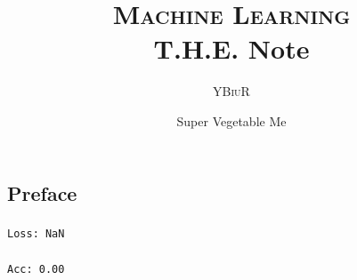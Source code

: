 \documentclass[oneside]{book}
\title{\textsc{Machine Learning}\\T.H.E. Note}
\author{\textsc{YBiuR}}
\date{Super Vegetable Me}
\theoremstyle{definition}
\theoremstyle{remark}
\begin{document}
\begin{spacing}{1.5}
\setlength{\parindent}{0em}

\frontmatter
\maketitle
\chapter*{Preface}
\paragraph{}\verb|Loss: NaN|
\paragraph{}\verb|Acc: 0.00|
\mainmatter



\end{spacing}
\end{document}
